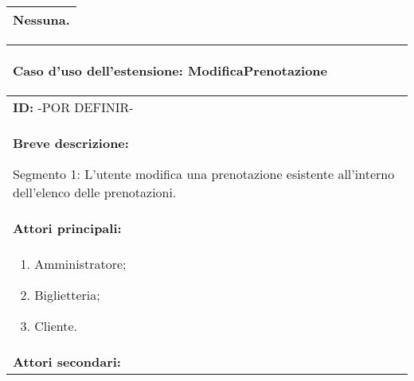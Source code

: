 \documentclass{article}
\begin{document}
\begin{table}[t]
\begin{tabular}{|p{\linewidth}|}
        Nessuna. \\
        \hline
    \end{tabular}
\end{table}

\begin{table}[t]
    \centering
    \begin{tabular}{|p{\linewidth}|}
        \hline
        \cellcolor{gray!100}
        \color{white}
        \begin{center}
            \textbf{Caso d'uso dell'estensione:} ModificaPrenotazione
        \end{center} \\
        \hline
        \textbf{ID:} -POR DEFINIR- \\
        \hline
        \cellcolor{gray!20}
        \textbf{Breve descrizione:}
        
        Segmento 1: L'utente modifica una prenotazione esistente all'interno dell'elenco delle prenotazioni. \\
        \hline
        \textbf{Attori principali:} \\
        \begin{minipage}{\linewidth}
            \begin{enumerate}[noitemsep]
                \item Amministratore;
                \item Biglietteria;
                \item Cliente. %
            \end{enumerate}
        \end{minipage}
        \vspace{0pt} \\
        \hline
        \textbf{Attori secondari:}
        

\end{tabular}
\end{table}
\end{document}
